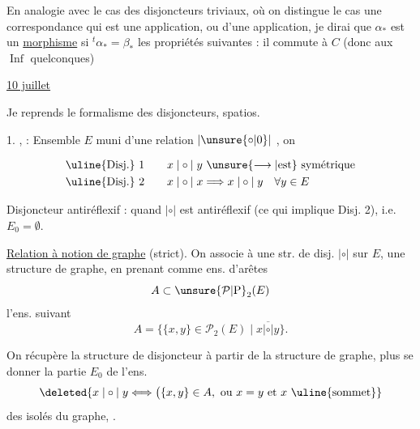 En analogie avec le cas des disjoncteurs triviaux, où on distingue le cas une correspondance qui est une application, ou  d'une application, je dirai que $\alpha_{\ast}$ est un \uline{morphisme} si $ {}^{t}\alpha_{\ast}=\beta_{\ast}$   les propriétés suivantes : il commute à $C$ (donc aux $\operatorname{Inf}$ quelconques)

\uline{10 juillet}

Je reprends  le formalisme des disjoncteurs, spatios.

1. \uline{},  : Ensemble $E$ muni d'une relation $\mathrel{|\unsure{\circ|0}|}$ , on  

\[
\begin{aligned}
&\text{\uline{Disj.} 1}\qquad x\mathrel{|\circ|}y\ \unsure{\longrightarrow|\text{est}}\ \text{symétrique}\\
&\text{\uline{Disj.} 2}\qquad x\mathrel{|\circ|}x\Longrightarrow x\mathrel{|\circ|}y\quad\forall y\in E
\end{aligned}
\]

 
Disjoncteur antiréflexif : quand $\mathrel{|\circ|}$ est antiréflexif (ce qui implique Disj. 2), i.e. $E_{0}=\emptyset$.

\uline{Relation à notion de graphe} (strict). On associe à une str. de disj. $\mathrel{|\circ|}$ sur $E$, une structure de graphe, en prenant comme ens. d'arêtes
\[
A\subset\unsure{\mathcal{P}|\mathrm{P}}_{2}(E)
\]
l'ens. suivant
\[
A=\bigl\{\{x,y\}\in\mathcal{P}_{2}(E)\mid x\mathrel{\overline{|\circ|}}y\bigr\}.
\]

On récupère  la structure de disjoncteur à partir de la structure de graphe,   plus se donner la partie $E_{0}$ de l'ens.
\[
\deleted{x\mathrel{|\circ|}y\Longleftrightarrow\bigl(\{x,y\}\in A,\ \text{ou }x=y\text{ et }x\ \text{\uline{sommet}}}
\]
des   isolés du graphe, .

